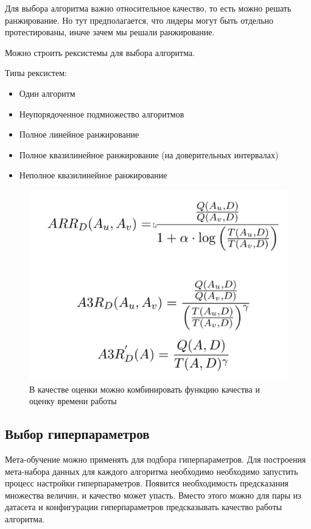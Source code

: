 Для выбора алгоритма важно относительное качество, то есть можно
решать ранжирование. Но тут предполагается, что лидеры могут быть
отдельно протестированы, иначе зачем мы решали ранжирование.

Можно строить рексистемы для выбора алгоритма.

Типы рексистем:
\begin{itemize}
    \item Один алгоритм
    \item Неупорядоченное подмножество алгоритмов
    \item Полное линейное ранжирование
    \item Полное квазилинейное ранжирование
    (на доверительных интервалах)
    \item Неполное квазилинейное ранжирование
\end{itemize}

\begin{figure}[H]
    \centering
    \includegraphics[scale=.4]{images/qvstime}
    \caption{В качестве оценки можно комбинировать
    функцию качества и оценку времени работы}
\end{figure}

\subsection*{Выбор гиперпараметров}

Мета-обучение можно применять для подбора гиперпараметров.
Для построения мета-набора данных для каждого алгоритма необходимо
необходимо запустить процесс настройки гиперпараметров. Появится
необходимость предсказания множества величин, и качество может
упасть. Вместо этого можно для пары из датасета и конфигурации
гиперпараметров предсказывать качество работы алгоритма.
